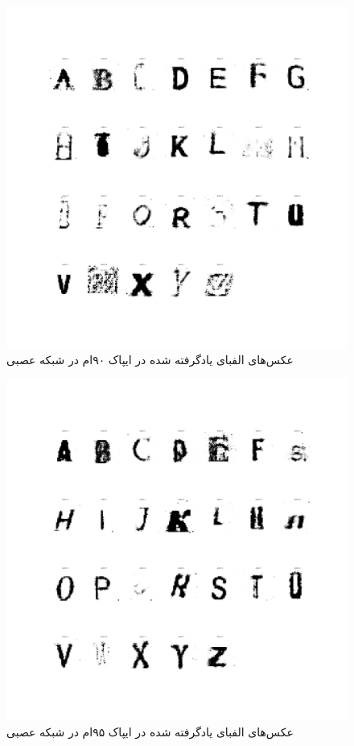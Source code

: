\documentclass{article}
\begin{document}
\begin{figure}[H]
	\centerline{\includegraphics[width=\textwidth , height=\textheight ]{../results/CGAN_Adam/figs/Alphabet_(Epoch=90)}}
	\caption{عکس‌های الفبای یادگرفته شده در ایپاک ۹۰ام در شبکه عصبی}
\end{figure}
\begin{figure}[H]
	\centerline{\includegraphics[width=\textwidth , height=\textheight ]{../results/CGAN_Adam/figs/Alphabet_(Epoch=95)}}
	\caption{عکس‌های الفبای یادگرفته شده در ایپاک ۹۵ام در شبکه عصبی}
\end{figure}
\end{document}
